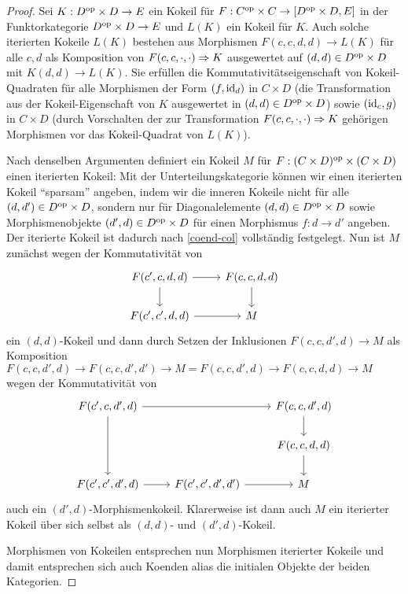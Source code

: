 \begin{proof}
  Sei $K: D^\mathrm{op} \times D \to E$ ein Kokeil für $F: C^\mathrm{op} \times C \to
  [D^\mathrm{op} \times D, E]$ in der Funktorkategorie $D^\mathrm{op} \times D \to E$
  und $L(K)$ ein Kokeil für $K$. Auch solche iterierten Kokeile $L(K)$
  bestehen aus Morphismen $F(c, c, d, d) \to L(K)$ für alle $c, d$ als
  Komposition von $F(c, c, \cdot, \cdot) \Rightarrow K$ ausgewertet auf
  $(d, d) \in D^\mathrm{op} \times D$ mit $K(d, d) \to L(K)$. Sie erfüllen die
  Kommutativitätseigenschaft von Kokeil-Quadraten für alle Morphismen
  der Form $(f, \operatorname{id}_d)$ in $C \times D$ (die Transformation aus der
  Kokeil-Eigenschaft von $K$ ausgewertet in $(d, d) \in D^\mathrm{op} \times
  D$) sowie $(\operatorname{id}_c, g)$ in $C \times D$ (durch Vorschalten der zur
  Transformation $F(c, c, \cdot, \cdot) \Rightarrow K$ gehörigen
  Morphismen vor das Kokeil-Quadrat von $L(K)$).

  Nach denselben Argumenten definiert ein Kokeil $M$ für $F: (C \times
  D)^\mathrm{op} \times (C \times D)$ einen iterierten Kokeil: Mit der
  Unterteilungskategorie können wir einen iterierten Kokeil
  ``sparsam'' angeben, indem wir die inneren Kokeile nicht für alle
  $(d, d') \in D^\mathrm{op} \times D$, sondern nur für Diagonalelemente $(d,
  d) \in D^\mathrm{op} \times D$ sowie Morphismenobjekte $(d', d) \in D^\mathrm{op}
  \times D$ für einen Morphismus $f: d \to d'$ angeben. Der iterierte
  Kokeil ist dadurch nach \ref{coend-col} vollständig festgelegt. Nun
  ist $M$ zunächst wegen der Kommutativität von
  \[ \begin{tikzcd}
    F(c', c, d, d) \arrow{r} \arrow{d} & F(c, c, d, d) \arrow{d} \\
    F(c', c', d, d) \arrow{r} & M
  \end{tikzcd} \]
  ein $(d, d)$-Kokeil und dann durch Setzen der Inklusionen $F(c, c,
  d', d) \to M$ als Komposition $F(c, c, d', d) \to F(c, c, d', d')
  \to M = F(c, c, d', d) \to F(c, c, d, d) \to M$ wegen der
  Kommutativität von
  \[ \begin{tikzcd}
    F(c', c, d', d) \arrow{rr} \arrow{dd} & & F(c, c, d', d) \arrow{d} \\
    & & F(c, c, d, d) \arrow{d} \\
    F(c', c', d', d) \arrow{r} & F(c', c', d', d') \arrow{r} & M
  \end{tikzcd} \]
  auch ein $(d', d)$-Morphismenkokeil. Klarerweise ist dann auch $M$
  ein iterierter Kokeil über sich selbst als $(d, d)$- und $(d',
  d)$-Kokeil.

  Morphismen von Kokeilen entsprechen nun Morphismen iterierter
  Kokeile und damit entsprechen sich auch Koenden alias die initialen
  Objekte der beiden Kategorien.
\end{proof}
